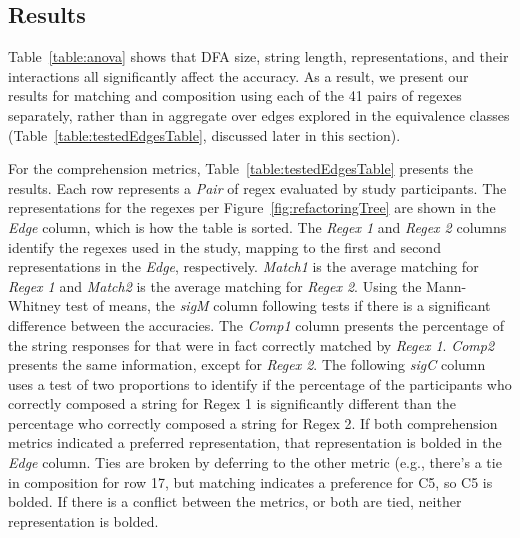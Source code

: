 \subsection{Results}
Table~\ref{table:anova} shows that DFA size, string length,  representations, and their interactions all significantly affect the accuracy. As a result, we present our results for  matching and composition  using each of the 41 pairs of regexes separately, rather than in aggregate over edges explored in the equivalence classes (Table~\ref{table:testedEdgesTable}, discussed later in this section). 




For the comprehension metrics, Table~\ref{table:testedEdgesTable} presents the results.
Each row represents a {\em Pair} of regex evaluated by study participants.
The representations for the regexes per Figure~\ref{fig:refactoringTree} are shown in the {\em Edge} column, which is how the table is sorted. 
The {\em Regex 1} and {\em Regex 2} columns identify the regexes used in the study, mapping to the first and second representations in the {\em Edge}, respectively. 
{\em Match1} is the average matching for {\em Regex 1} and {\em Match2} is the average matching for {\em Regex 2}. 
Using the Mann-Whitney test of means, the {\em sigM} column following tests if there is a significant difference between the accuracies. 
The {\em Comp1} column presents the percentage of the string responses for that were in fact correctly matched by {\em Regex 1}. {\em Comp2} presents the same information, except for {\em Regex 2}. 
The following {\em sigC} column uses a test of two proportions to identify if the percentage of the participants who correctly composed a string for Regex 1 is significantly different than the percentage who correctly composed a string for {Regex 2}. 
If both comprehension metrics indicated a preferred representation, that representation is bolded in the \emph{Edge} column. Ties are broken by deferring to the other metric (e.g., there's a tie in composition for row 17, but matching indicates a preference for C5, so C5 is bolded. If there is a conflict between the metrics, or both are tied, neither representation is bolded. 



